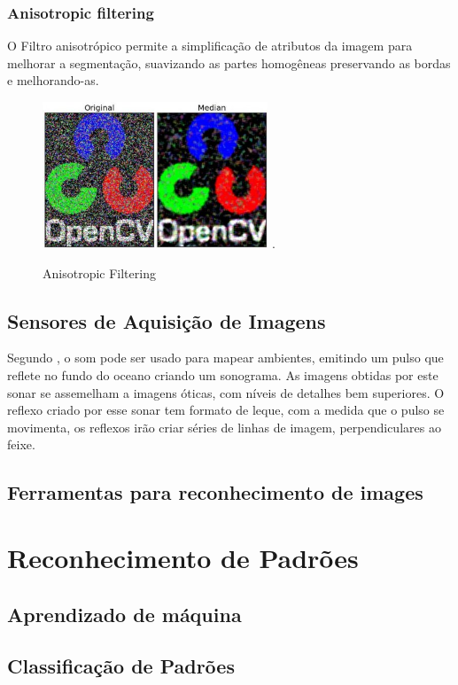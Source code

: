     \[
    \]
    

\subsubsection{Anisotropic filtering}
O Filtro anisotrópico permite a simplificação de atributos da imagem para melhorar a segmentação,  suavizando as partes homogêneas preservando as bordas e melhorando-as.

 \begin{figure}[H]
	\centering
    	\caption{\label{fig:anisifilter}Anisotropic Filtering}
		\includegraphics[width = 0.6\textwidth]	{resources/anisifilter}
    	.
\end{figure}

\subsection{Sensores de Aquisição de Imagens}
Segundo , o som pode ser usado para mapear ambientes, emitindo um pulso que reflete no fundo do oceano criando um sonograma. As imagens obtidas por este sonar se assemelham a imagens óticas, com níveis de detalhes bem superiores. O reflexo criado por esse sonar tem formato de leque, com a medida que o pulso se movimenta, os reflexos irão criar séries de linhas de imagem, perpendiculares ao feixe.  

\subsection{Ferramentas para reconhecimento de images}


\section{Reconhecimento de Padrões}


\subsection{Aprendizado de máquina} 


\subsection{Classificação de Padrões}




    
